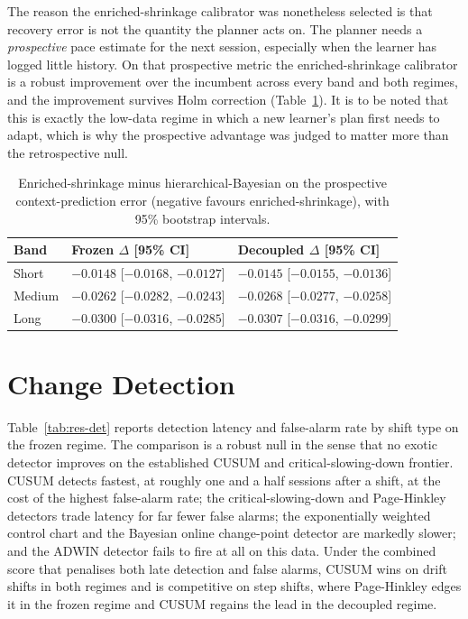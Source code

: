 The reason the enriched-shrinkage calibrator was nonetheless selected is that recovery error is not the quantity the planner acts on. The planner needs a \emph{prospective} pace estimate for the next session, especially when the learner has logged little history. On that prospective metric the enriched-shrinkage calibrator is a robust improvement over the incumbent across every band and both regimes, and the improvement survives Holm correction (Table~\ref{tab:res-cal-ctx}). It is to be noted that this is exactly the low-data regime in which a new learner's plan first needs to adapt, which is why the prospective advantage was judged to matter more than the retrospective null.

\begin{table}[htbp]
\centering
\footnotesize
\caption{Enriched-shrinkage minus hierarchical-Bayesian on the prospective context-prediction error (negative favours enriched-shrinkage), with 95\% bootstrap intervals.}
\label{tab:res-cal-ctx}
\begin{tabular}{l l l}
\toprule
\textbf{Band} & \textbf{Frozen $\Delta$ [95\% CI]} & \textbf{Decoupled $\Delta$ [95\% CI]} \\
\midrule
Short & $-0.0148$ [$-0.0168$, $-0.0127$] & $-0.0145$ [$-0.0155$, $-0.0136$] \\
Medium & $-0.0262$ [$-0.0282$, $-0.0243$] & $-0.0268$ [$-0.0277$, $-0.0258$] \\
Long & $-0.0300$ [$-0.0316$, $-0.0285$] & $-0.0307$ [$-0.0316$, $-0.0299$] \\
\bottomrule
\end{tabular}
\end{table}

\section{Change Detection}
Table~\ref{tab:res-det} reports detection latency and false-alarm rate by shift type on the frozen regime. The comparison is a robust null in the sense that no exotic detector improves on the established CUSUM and critical-slowing-down frontier. CUSUM detects fastest, at roughly one and a half sessions after a shift, at the cost of the highest false-alarm rate; the critical-slowing-down and Page-Hinkley detectors trade latency for far fewer false alarms; the exponentially weighted control chart and the Bayesian online change-point detector are markedly slower; and the ADWIN detector fails to fire at all on this data. Under the combined score that penalises both late detection and false alarms, CUSUM wins on drift shifts in both regimes and is competitive on step shifts, where Page-Hinkley edges it in the frozen regime and CUSUM regains the lead in the decoupled regime.

